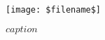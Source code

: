 

\vfill
\begin{figure}
	\centering
		\texttt{[image: \$filename\$]}
	\caption{$caption$}
\end{figure}
\vfill